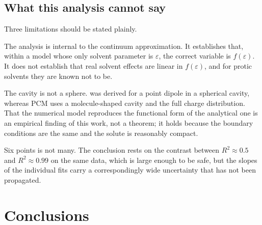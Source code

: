 \documentclass[10pt,a4paper]{article}
\begin{document}
\subsection{What this analysis cannot say}
\label{sec:limits}

Three limitations should be stated plainly.

The analysis is internal to the continuum approximation. It establishes that, within
a model whose only solvent parameter is $\varepsilon$, the correct variable is
$f(\varepsilon)$. It does not establish that real solvent effects are linear in
$f(\varepsilon)$, and for protic solvents they are known not to be.

The cavity is not a sphere.  was derived for a point dipole in a
spherical cavity, whereas PCM uses a molecule-shaped cavity and the full charge
distribution. That the numerical model reproduces the functional form of the
analytical one is an empirical finding of this work, not a theorem; it holds because
the boundary conditions are the same and the solute is reasonably compact.

Six points is not many. The conclusion rests on the contrast between $R^{2}
\approx 0.5$ and $R^{2} \approx 0.99$ on the same data, which is large enough to be
safe, but the slopes of the individual fits carry a correspondingly wide uncertainty
that has not been propagated.

\section{Conclusions}
\end{document}
